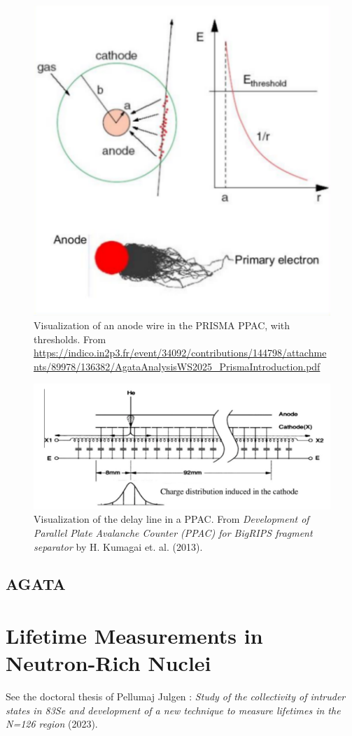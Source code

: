 \documentclass{article}
\begin{document}
\begin{figure}[htbp!]
    \centering
    \includegraphics[width=0.5\linewidth]{Figures/PRISMA/PPAC/AnodeWireEnergyThresholds.pdf}
    \caption{Visualization of an anode wire in the PRISMA PPAC, with thresholds. From \url{https://indico.in2p3.fr/event/34092/contributions/144798/attachments/89978/136382/AgataAnalysisWS2025_PrismaIntroduction.pdf}}
    \label{fig:PrismaAnodeWireThresh}
\end{figure}
\begin{figure}[htbp!]
    \centering
    \includegraphics[width=0.5\linewidth]{Figures/PRISMA/PPAC/PPACDelayLine.pdf}
    \caption{Visualization of the delay line in a PPAC. From \emph{Development of Parallel Plate Avalanche Counter (PPAC)
for BigRIPS fragment separator} by H. Kumagai et. al. (2013).}
    \label{fig:PPACDelayLine}
\end{figure}

\subsection{AGATA}

\pagebreak

\section{Lifetime Measurements in Neutron-Rich Nuclei}
See the doctoral thesis of Pellumaj Julgen : \emph{Study of the collectivity of intruder states in 83Se and
development of a new technique to measure lifetimes
in the N=126 region} (2023).
\end{document}
